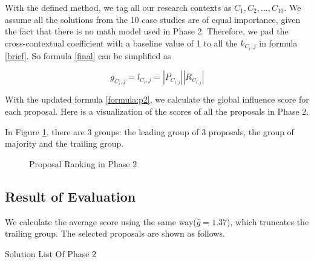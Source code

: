 With the defined method, we tag all our research contexts as $C_{1}, C_{2}, \ldots, C_{10}$. We assume all the solutions from the 10 case studies are of equal importance, given the fact that there is no math model used in Phase 2. Therefore, we pad the cross-contextual coefficient with a baseline value of 1 to all the $\mathit{k_{C_{i},j}}$ in formula \ref{brief}. So formula \ref{final} can be simplified as 

\begin{equation}
g_{C_{i},j} = l_{C_{i},j} = |P_{C_{i,j}}| |R_{C_{i,j}}|
\label{formula:p2}
\end{equation}

With the updated formula \ref{formula:p2}, we calculate the global influence score for each proposal. Here is a visualization of the scores of all the proposals in Phase 2.

In Figure \ref{fig:rankingp2}, there are 3 groups: the leading group of 3 proposals, the group of majority and the trailing group.
\begin{figure}[!ht]
\centering
\caption{Proposal Ranking in Phase 2}
\label{fig:rankingp2}
\end{figure}


\subsection{Result of Evaluation}
We calculate the average score using the same way($\bar{g}=1.37$), which truncates the trailing group. The selected proposals are shown as follows.

\begin{table}[!ht]
\caption{Solution List Of Phase 2}
\begin{adjustbox}{width=1\textwidth}
\end{adjustbox}
\label{tab:solution2}
\end{table}
